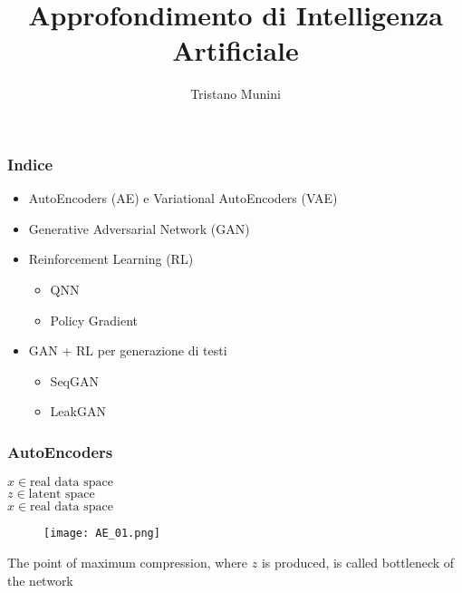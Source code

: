 \documentclass{beamer}
\title{Approfondimento di Intelligenza Artificiale}
\author{Tristano Munini}
\begin{document}
{
  \frame{\titlepage}
}

\begin{frame}
\frametitle{Indice}
\begin{itemize}
  \item AutoEncoders (AE) e Variational AutoEncoders (VAE)
  \item Generative Adversarial Network (GAN)
  \item Reinforcement Learning (RL)
    \begin{itemize}
      \item QNN
      \item Policy Gradient
    \end{itemize}
  \item GAN + RL per generazione di testi
    \begin{itemize}
      \item SeqGAN
      \item LeakGAN
    \end{itemize}
\end{itemize}
\end{frame}



\begin{frame}
\frametitle{AutoEncoders}
$ x \in \textrm{real data space}$
\\
$ z \in \textrm{latent space}$
\\
$ \hat x \in \textrm{real data space}$


\begin{figure}[ht]
  \texttt{[image: AE\_01.png]}
\end{figure}

The point of maximum compression, where $z$ is produced, is called bottleneck of the network

\end{frame}
\end{document}

